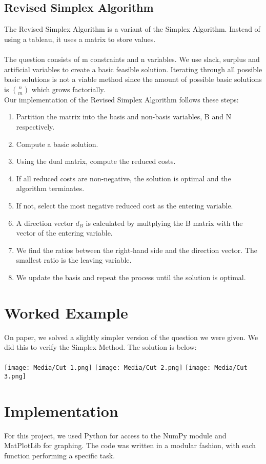 \documentclass{article}
\numberwithin{equation}{section}
\begin{document}
\subsection{Revised Simplex Algorithm}
The Revised Simplex Algorithm is a variant of the Simplex Algorithm. Instead of using a tableau, it uses a matrix to store values.\\ \\
The question consists of m constraints and n variables. We use slack, surplus and artificial variables to create a basic feasible solution. Iterating through all possible basic solutions is not a viable method since the amount of possible basic solutions is $\binom{n}{m}$ which grows factorially.\\
Our implementation of the Revised Simplex Algorithm follows these steps:
\begin{enumerate}
    \item Partition the matrix into the basis and non-basis variables, B and N respectively.
    \item Compute a basic solution.
    \item Using the dual matrix, compute the reduced costs.
    \item If all reduced costs are non-negative, the solution is optimal and the algorithm terminates.
    \item If not, select the most negative reduced cost as the entering variable.
    \item A direction vector $d_B$ is calculated by multplying the B matrix with the vector of the entering variable.
    \item We find the ratios between the right-hand side and the direction vector. The smallest ratio is the leaving variable.
    \item We update the basis and repeat the process until the solution is optimal.
\end{enumerate}
\newpage
\section{Worked Example}
On paper, we solved a slightly simpler version of the question we were given. We did this to verify the Simplex Method. The solution is below: \\ \\
\texttt{[image: Media/Cut 1.png]}
\texttt{[image: Media/Cut 2.png]}
\texttt{[image: Media/Cut 3.png]}
\newpage
\section{Implementation}
For this project, we used Python for access to the NumPy module and MatPlotLib for graphing. The code was written in a modular fashion, with each function performing a specific task.
\end{document}
